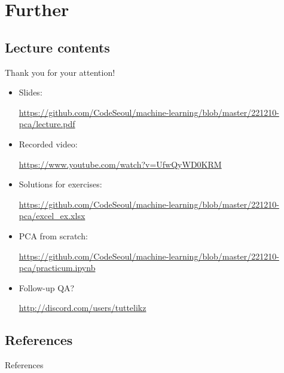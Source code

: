 \documentclass{beamer}
\begin{document}
    

    \nocite{*}




    \section{Further}
    \subsection{Lecture contents}
    \begin{frame}{}
      \begin{center}
      \begin{huge}Thank you for your attention!\end{huge}
      \end{center}

        \vspace{0.2cm}
        \begin{itemize}
            \item Slides: \\
            \begin{small}\url{https://github.com/CodeSeoul/machine-learning/blob/master/221210-pca/lecture.pdf}
            \end{small}
            \item Recorded video: \\
            \begin{small}\url{https://www.youtube.com/watch?v=UfwQyWD0KRM}
            \end{small}
            \item Solutions for exercises: \\
            \begin{small}\url{https://github.com/CodeSeoul/machine-learning/blob/master/221210-pca/excel_ex.xlsx}
            \end{small}
            \item PCA from scratch: \\
            \begin{small}\url{https://github.com/CodeSeoul/machine-learning/blob/master/221210-pca/practicum.ipynb}
            \end{small}
            \item Follow-up QA? \\ 
            \begin{small}\url{http://discord.com/users/tuttelikz}
            \end{small}
        \end{itemize}
    \end{frame}

    \subsection{References}
    \begin{frame}{References}
      \printbibliography
    \end{frame}
\end{document}
